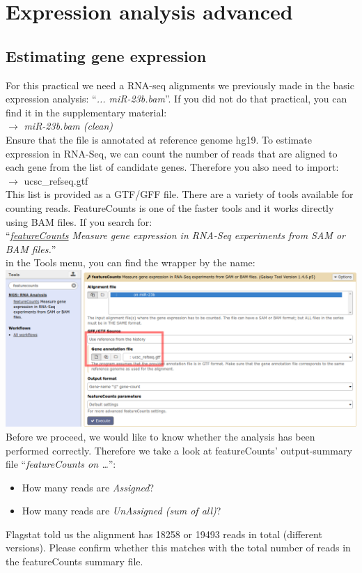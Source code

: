 \section{Expression analysis advanced}
\subsection{Estimating gene expression}
For this practical we need a RNA-seq alignments we previously made in the basic expression analysis: ``\textit{... miR-23b.bam}''. If you did not do that practical, you can find it in the supplementary material: \\
\datalibrarydirrnaseqadvanced $\rightarrow$ \textit{miR-23b.bam (clean)}\\
Ensure that the file is annotated at reference genome hg19. To estimate expression in RNA-Seq, we can count the number of reads that are aligned to each gene from the list of candidate genes. Therefore you also need to import:\\
\datalibrarydirrnaseqadvanced $\rightarrow$ ucsc\_refseq.gtf\\
This list is provided as a GTF/GFF file.
There are a variety of tools available for counting reads.
FeatureCounts is one of the faster tools and it works directly using BAM files. If you search for:\\
``\textit{\underline{featureCounts} Measure gene expression in RNA-Seq experiments from SAM or BAM files.}''\\
in the Tools menu, you can find the wrapper by the name:\\
\includegraphics[width=\textwidth]{figures/expression_01.png}\\
Before we proceed, we would like to know whether the analysis has been performed correctly. Therefore we take a look at featureCounts’ output-summary file ``\textit{featureCounts on \ldots}'':
\begin{itemize}
	\item How many reads are \textit{Assigned}?
	\item How many reads are \textit{UnAssigned (sum of all)}?
\end{itemize}
Flagstat told us the alignment has 18258 or 19493 reads in total (different versions).
Please confirm whether this matches with the total number of reads in the featureCounts summary file.

